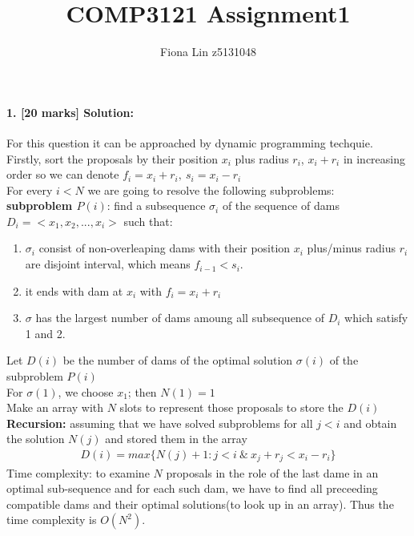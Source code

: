 \documentclass[a4paper]{scrartcl}
\title{COMP3121 Assignment1}
\author{Fiona Lin z5131048}
\begin{document}
\maketitle
\paragraph{1. [20 marks] Solution:}
\label{sec:Question 1}
For this question it can be approached by dynamic programming techquie.\\
Firstly, sort the proposals by their position $x_i$ plus radius $r_i$, $x_i + r_i$ in increasing order so we can denote $f_i = x_i + r_i,\ s_i = x_i - r_i$\\
For every $i < N$ we are going to resolve the following subproblems:\\
\textbf{subproblem $P(i)$}: find a subsequence $\sigma_i$ of the sequence of dams $D_i=\big<x_1, x_2,..., x_i\big>$ such that:
\begin{enumerate}[label=(\arabic*)]
  \item $\sigma_i$ consist of non-overleaping dams with their position $x_i$ plus/minus radius $r_i$ are disjoint interval, which means $f_{i-1} < s_i$.
  \item it ends with dam at $x_i$ with $f_i=x_i+r_i$
  \item $\sigma$ has the largest number of dams amoung all subsequence of $D_i$ which satisfy 1 and 2.
\end{enumerate}
Let $D(i)$ be the number of dams of the optimal solution $\sigma(i)$ of the subproblem $P(i)$\\
For $\sigma(1)$, we choose $x_1$; then $N(1)=1$\\
Make an array with $N$ slots to represent those proposals to store the $D(i)$ \\
\textbf{Recursion:} assuming that we have solved subproblems for all $j<i$ and obtain the solution $N(j)$ and stored them in the array
\begin{align*}
  D(i) =  max\{ N(j) + 1 : j < i\ \& \ x_j + r_j < x_i - r_i\}
\end{align*}
Time complexity: to examine $N$ proposals in the role of the last dame in an optimal sub-sequence and for each such dam, we have to find all preceeding compatible dams and their optimal solutions(to look up in an array). Thus the time complexity is $O(N^2)$.
\end{document}
